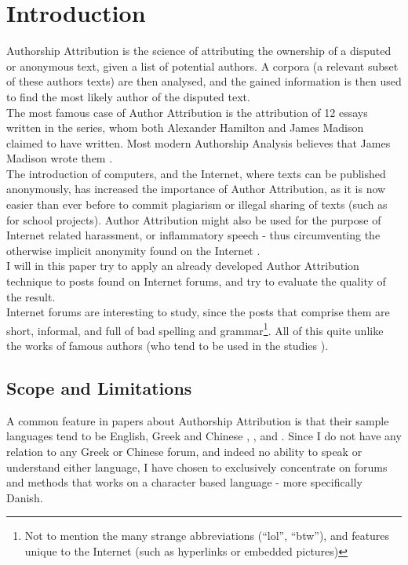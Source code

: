 \section{Introduction}
\label{introduction}
Authorship Attribution is the science of attributing the ownership of a disputed or anonymous text, given a list of potential authors. A corpora (a relevant subset of these authors texts) are then analysed, and the gained information is then used to find the most likely author of the disputed text.\\

The most famous case of Author Attribution is the attribution of 12 essays written in the  series, whom both Alexander Hamilton and James Madison claimed to have written. Most modern Authorship Analysis believes that James Madison wrote them \cite{Fung03thedisputed}.\\
 The introduction of computers, and the Internet, where texts can be published anonymously, has increased the importance of Author Attribution, as it is now easier than ever before to commit plagiarism or illegal sharing of texts (such as for school projects). Author Attribution might also be used for the purpose of Internet related harassment, or inflammatory speech - thus circumventing the otherwise implicit anonymity found on the Internet .\\ 

I will in this paper try to apply an already developed Author Attribution technique to posts found on Internet forums, and try to evaluate the quality of the result.\\

Internet forums are interesting to study, since the posts that comprise them are short, informal, and full of bad spelling and grammar\footnote{Not to mention the many strange abbreviations (``lol'', ``btw''), and features unique to the Internet (such as hyperlinks or embedded pictures)}. All of this quite unlike the works of famous authors (who tend to be used in the studies \cite{nr4}). 

\subsection{Scope and Limitations}
\label{scope}
A common feature in papers about Authorship Attribution is that their sample languages tend to be English, Greek and Chinese \cite{syntactic}, \cite{nr2}, \cite{nr4} and \cite{app-spe}. Since I do not have any relation to any Greek or Chinese forum, and indeed no ability to speak or understand either language, I have chosen to exclusively concentrate on forums and methods that works on a character based language - more specifically Danish.

